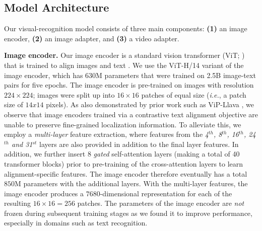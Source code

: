 \subsection{Model Architecture}
\label{section:vision_model_architecture}
Our visual-recognition model consists of three main components: \textbf{(1)} an image encoder, \textbf{(2)} an image adapter, and \textbf{(3)} a video adapter.

\textbf{Image encoder.} Our image encoder is a standard vision transformer (ViT; \citet{dosovitskiy2020vit}) that is trained to align images and text \citep{xu2023demystifying}.
We use the ViT-H/14 variant of the image encoder, which has 630M parameters that were trained on 2.5B image-text pairs for five epochs.
The image encoder is pre-trained on images with resolution $224 \times 224$; images were split up into $16 \times 16$ patches of equal size (\emph{i.e.}, a patch size of $14x14$ pixels).
As also demonstrated by prior work such as ViP-Llava \citep{cai2023vipllava}, we observe that image encoders trained via a contrastive text alignment objective are unable to preserve fine-grained localization information. To alleviate this, we employ a \emph{multi-layer} feature extraction, where features from the \emph{4$^{th}$, 8$^{th}$, 16$^{th}$, 24$^{th}$ and 31$^{st}$} layers are also provided in addition to the final layer features.
In addition, we further insert 8 \emph{gated} self-attention layers (making a total of 40 transformer blocks) prior to pre-training of the cross-attention layers to learn alignment-specific features. The image encoder therefore eventually has a total $850$M parameters with the additional layers.
With the multi-layer features, the image encoder produces a $7680$-dimensional representation for each of the resulting $16 \times 16\!=\!256$ patches.
The parameters of the image encoder are \emph{not} frozen during subsequent training stages as we found it to improve performance, especially in domains such as text recognition.

